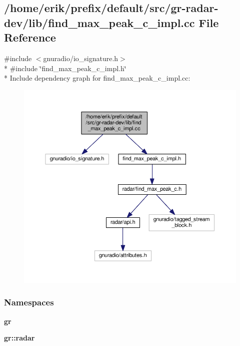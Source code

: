 \subsection{/home/erik/prefix/default/src/gr-\/radar-\/dev/lib/find\+\_\+max\+\_\+peak\+\_\+c\+\_\+impl.cc File Reference}
\label{find__max__peak__c__impl_8cc}
{\ttfamily \#include $<$gnuradio/io\+\_\+signature.\+h$>$}\\*
{\ttfamily \#include \char`\"{}find\+\_\+max\+\_\+peak\+\_\+c\+\_\+impl.\+h\char`\"{}}\\*
Include dependency graph for find\+\_\+max\+\_\+peak\+\_\+c\+\_\+impl.\+cc\+:
\nopagebreak
\begin{figure}[H]
\begin{center}
\leavevmode
\includegraphics[width=350pt]{dd/db5/find__max__peak__c__impl_8cc__incl}
\end{center}
\end{figure}
\subsubsection*{Namespaces}
\begin{DoxyCompactItemize}
\item 
 {\bf gr}
\item 
 {\bf gr\+::radar}
\end{DoxyCompactItemize}
